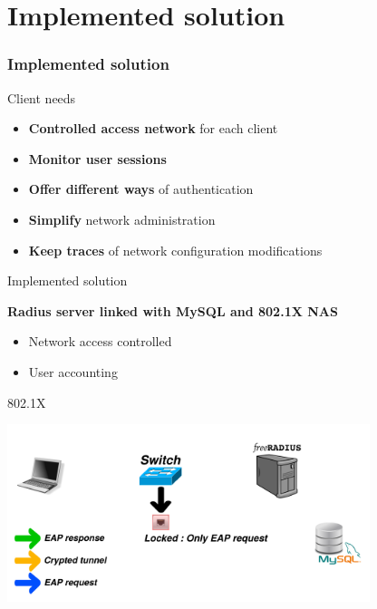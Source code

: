 \documentclass[12pt]{beamer}
\begin{document}
\part{Implemented solution}
\frame{\partpage}
\section{Implemented solution}

\begin{frame}{Client needs}
    \begin{itemize}[<+->]
	\item \textbf{Controlled access network} for each client
	\vfill
	\item \textbf{Monitor user sessions}
	\vfill 
	\item \textbf{Offer different ways} of authentication
	\vfill
	\item \textbf{Simplify} network administration
	\vfill
	\item \textbf{Keep traces} of network configuration modifications
    \end{itemize}
\end{frame}

\begin{frame}{Implemented solution}
    \begin{center}
    \textbf{Radius server linked with MySQL and 802.1X NAS}
    \end{center}

    \pause
    \begin{itemize}[<+->]\vfill
	\item Network access controlled\vfill
	\item User accounting\vfill
    \end{itemize}
\end{frame}

\begin{frame}{802.1X}
\vfill
\begin{center}
    \includegraphics[width=300pt]{img/dot1x_1.pdf}
\end{center}
\vfill
\end{frame}
\end{document}
